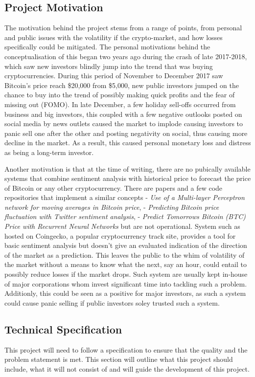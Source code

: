\documentclass[oneside, 10pt]{article}
\begin{document}
		\subsection{Project Motivation}
		The motivation behind the project stems from a range of points, from personal and public issues with the volatility if the crypto-market, and how losses specifically could be mitigated. The personal motivations behind the conceptualisation of this began two years ago during the crash of late 2017-2018, which saw new investors blindly jump into the trend that was buying cryptocurrencies. During this period of November to December 2017 saw Bitcoin's price reach \$20,000 from \$5,000, new public investors jumped on the chance to buy into the trend of possibly making quick profits and the fear of missing out (FOMO). In late December, a few holiday sell-offs occurred from business and big investors, this coupled with a few negative outlooks posted on social media by news outlets caused the market to implode causing investors to panic sell one after the other and posting negativity on social, thus causing more decline in the market. As a result, this caused personal monetary loss and distress as being a long-term investor.
		
		Another motivation is that at the time of writing, there are no pubically available systems that combine sentiment analysis with historical price to forecast the price of Bitcoin or any other cryptocurrency. There are papers and a few code repositories that implement a similar concepts \cite{2} - \textit{Use of a Multi-layer Perceptron network for moving averages in Bitcoin price}, \cite{3} - \textit{Predicting Bitcoin price fluctuation with Twitter sentiment analysis}, \cite{4} - \textit{Predict Tomorrows Bitcoin (BTC) Price with Recurrent Neural Networks} but are not operational. System such as \cite{1} hosted on Coingecko, a popular cryptocurrency track site, provides a tool for basic sentiment analysis but doesn't give an evaluated indication of the direction of the market as a prediction. This leaves the public to the whim of volatility of the market without a means to know what the next, say an hour, could entail to possibly reduce losses if the market drops. Such system are usually kept in-house of major corporations whom invest significant time into tackling such a problem. Additionly, this could be seen as a positive for major investors, as such a system could cause panic selling if public investors soley trusted such a system.
			
		\newpage
		\subsection{Technical Specification}
		This project will need to follow a specification to ensure that the quality and the problem statement is met. This section will outline what this project should include, what it will not consist of and will guide the development of this project.
		\newline
		
\end{document}
